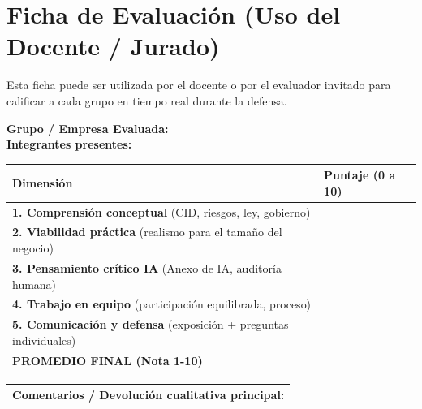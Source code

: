 \documentclass[12pt,a4paper]{article}
\renewcommand{\arraystretch}{1.25}
\begin{document}
\newpage
\section{Ficha de Evaluaci\'on (Uso del Docente / Jurado)}

\begin{cajaNota}[title={Para la c\'atedra}]
Esta ficha puede ser utilizada por el docente o por el evaluador invitado para calificar a cada grupo en tiempo real durante la defensa.
\end{cajaNota}

\vspace{6pt}
\noindent\textbf{Grupo / Empresa Evaluada:} \hrulefill\\[6pt]
\noindent\textbf{Integrantes presentes:} \hrulefill

\vspace{8pt}
\renewcommand{\arraystretch}{1.5}
\begin{tabularx}{\textwidth}{|X|>{\centering\arraybackslash}p{2.5cm}|}
\hline
\rowcolor{azulExamen!15}
\textbf{Dimensi\'on} & \textbf{Puntaje (0 a 10)} \\
\hline
\textbf{1. Comprensi\'on conceptual} (CID, riesgos, ley, gobierno) & \hrulefill \\
\hline
\textbf{2. Viabilidad pr\'actica} (realismo para el tama\~no del negocio) & \hrulefill \\
\hline
\textbf{3. Pensamiento cr\'itico IA} (Anexo de IA, auditor\'ia humana) & \hrulefill \\
\hline
\textbf{4. Trabajo en equipo} (participaci\'on equilibrada, proceso) & \hrulefill \\
\hline
\textbf{5. Comunicaci\'on y defensa} (exposici\'on + preguntas individuales) & \hrulefill \\
\hline
\rowcolor{grisClaro}
\textbf{PROMEDIO FINAL (Nota 1-10)} & \textbf{\hrulefill} \\
\hline
\end{tabularx}

\vspace{8pt}
\begin{tabularx}{\textwidth}{|X|}
\hline
\textbf{Comentarios / Devoluci\'on cualitativa principal:} \\[4cm]
\hline
\end{tabularx}

\newpage
\end{document}
